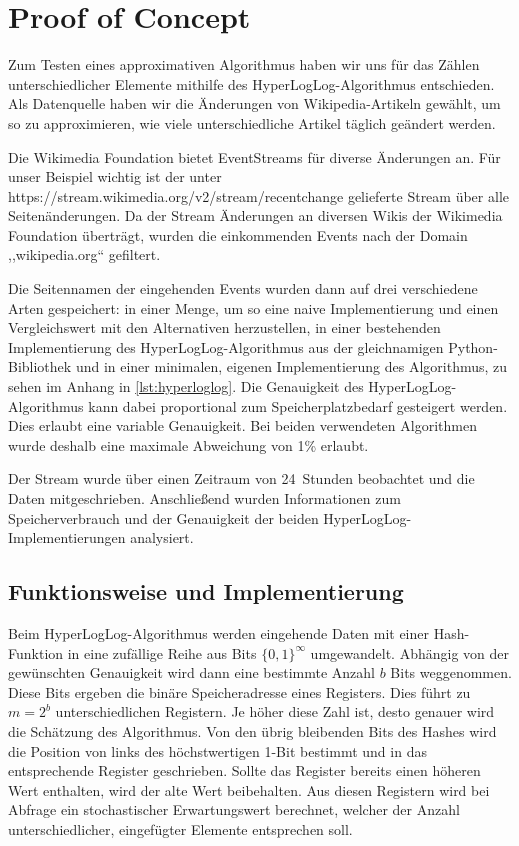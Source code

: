 \section{Proof of Concept}

Zum Testen eines approximativen Algorithmus haben wir uns für das Zählen unterschiedlicher Elemente mithilfe des HyperLogLog-Algorithmus entschieden.
Als Datenquelle haben wir die Änderungen von Wikipedia-Artikeln gewählt, um so zu approximieren, wie viele unterschiedliche Artikel täglich geändert werden.

Die Wikimedia Foundation bietet EventStreams für diverse Änderungen an.
Für unser Beispiel wichtig ist der unter https://stream.wikimedia.org/v2/stream/recentchange gelieferte Stream über alle Seitenänderungen.
Da der Stream Änderungen an diversen Wikis der Wikimedia Foundation überträgt, wurden die einkommenden Events nach der Domain ,,wikipedia.org`` gefiltert.

Die Seitennamen der eingehenden Events wurden dann auf drei verschiedene Arten gespeichert:  in einer Menge, um so eine naive Implementierung und einen Vergleichswert mit den Alternativen herzustellen, in einer bestehenden Implementierung des HyperLogLog-Algorithmus aus der gleichnamigen Python-Bibliothek \cite{evseenko2018} und in einer minimalen, eigenen Implementierung des Algorithmus, zu sehen im Anhang in \autoref{lst:hyperloglog}.
Die Genauigkeit des HyperLogLog-Algorithmus kann dabei proportional zum Speicherplatzbedarf gesteigert werden.
Dies erlaubt eine variable Genauigkeit.
Bei beiden verwendeten Algorithmen wurde deshalb eine maximale Abweichung von 1\% erlaubt.

Der Stream wurde über einen Zeitraum von 24~Stunden beobachtet und die Daten mitgeschrieben.
Anschließend wurden Informationen zum Speicherverbrauch und der Genauigkeit der beiden HyperLogLog-Implementierungen analysiert.

\subsection{Funktionsweise und Implementierung}

Beim HyperLogLog-Algorithmus werden eingehende Daten mit einer Hash-Funktion in eine zufällige Reihe aus Bits $\{0, 1\}^\infty$ umgewandelt.
Abhängig von der gewünschten Genauigkeit wird dann eine bestimmte Anzahl $b$ Bits weggenommen.
Diese Bits ergeben die binäre Speicheradresse eines Registers.
Dies führt zu $m=2^b$ unterschiedlichen Registern.
Je höher diese Zahl ist, desto genauer wird die Schätzung des Algorithmus.
Von den übrig bleibenden Bits des Hashes wird die Position von links des höchstwertigen 1-Bit bestimmt und in das entsprechende Register geschrieben.
Sollte das Register bereits einen höheren Wert enthalten, wird der alte Wert beibehalten.
Aus diesen Registern wird bei Abfrage ein stochastischer Erwartungswert berechnet, welcher der Anzahl unterschiedlicher, eingefügter Elemente entsprechen soll.
\cite{flajolet2007}

